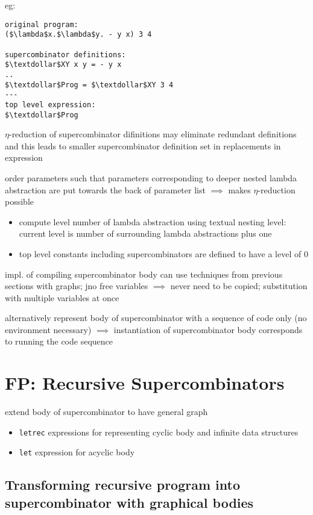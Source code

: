\documentclass[8pt]{extarticle}
\begin{document}
\begin{multicols*}{2}
\begin{tblr}[]{}
eg:

\begin{lstlisting}
original program:
($\lambda$x.$\lambda$y. - y x) 3 4

supercombinator definitions:
$\textdollar$XY x y = - y x
..
$\textdollar$Prog = $\textdollar$XY 3 4
---
top level expression:
$\textdollar$Prog
\end{lstlisting}

$\eta$-reduction of supercombinator difinitions may eliminate redundant definitions and this leads to smaller supercombinator definition set in replacements in expression

order parameters such that parameters corresponding to deeper nested lambda abstraction are put towards the back of parameter list $\implies$ makes $\eta$-reduction possible
\begin{itemize}
\item compute level number of lambda abstraction using textual nesting level: current level is number of surrounding lambda abstractions plus one
\item top level constants including supercombinators are defined to have a level of 0
\end{itemize}

impl. of compiling supercombinator body can use techniques from previous sections with graphs; jno free variables $\implies$ never need to be copied; substitution with multiple variables at once

alternatively represent body of supercombinator with a sequence of code only (no environment necessary) $\implies$ instantiation of supercombinator body corresponds to running the code sequence

\section{FP: Recursive Supercombinators}

extend body of supercombinator to have general graph

\begin{itemize}
\item \verb|letrec| expressions for representing cyclic body and infinite data structures
\item \verb|let| expression for acyclic body
\end{itemize}

\subsection{Transforming recursive program into supercombinator with graphical bodies}


\end{tblr}
\end{multicols*}
\end{document}
